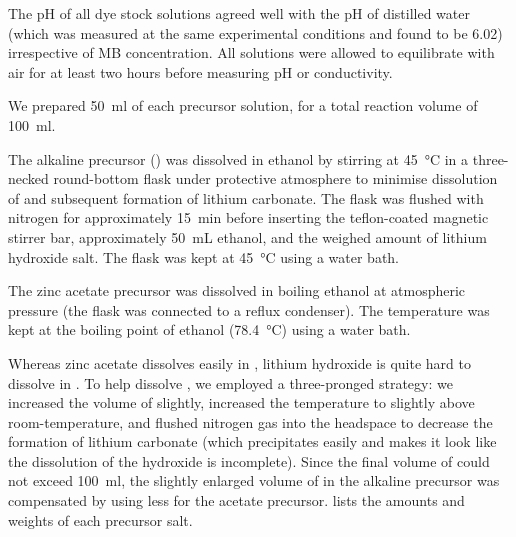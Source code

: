 \documentclass[9pt,twoside,twocolumn]{article}\usepackage{knitr}
\begin{document}
\begin{refsection}
The pH of all dye stock solutions agreed well with the pH of distilled water (which was measured at the same experimental conditions and found to be \num{6.02}) irrespective of MB concentration. All solutions were allowed to equilibrate with air for at least two hours before measuring pH or conductivity. 


We prepared \qty{50}{\ml} of each precursor solution, for a total reaction volume of \qty{100}{\ml}.

The alkaline precursor () was dissolved in ethanol by stirring at \qty{45}{\celsius} in a three-necked round-bottom flask under protective  atmosphere to minimise dissolution of  and subsequent formation of lithium carbonate.
The flask was flushed with nitrogen for approximately \qty{15}{\minute} before inserting the teflon-coated magnetic stirrer bar, approximately \qty{50}{\mL} ethanol, and the weighed amount of lithium hydroxide salt.
The flask was kept at \qty{45}{\degreeCelsius} using a water bath.

The zinc acetate precursor was dissolved in boiling ethanol at atmospheric pressure (the flask was connected to a reflux condenser). The temperature was kept at the boiling point of ethanol (\qty{78.4}{\degreeCelsius}) using a water bath.

Whereas zinc acetate dissolves easily in , lithium hydroxide is quite hard to dissolve in . To help dissolve , we employed a three-pronged strategy: we increased the volume of  slightly, increased the temperature to slightly above room-temperature, and flushed nitrogen gas into the headspace to decrease the formation of lithium carbonate (which precipitates easily and makes it look like the dissolution of the hydroxide is incomplete).
Since the final volume of  could not exceed \qty{100}{\ml}, the slightly enlarged volume of  in the alkaline precursor was compensated by using less  for the acetate precursor.  lists the amounts and weights of each precursor salt.


\end{refsection}
\end{document}
